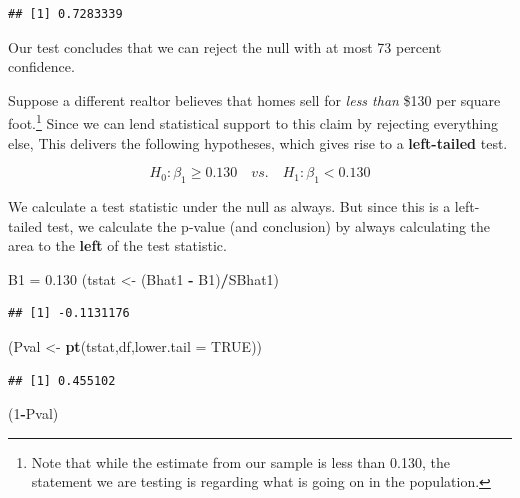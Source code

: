 \documentclass[
]{book}
\newenvironment{Shaded}{\begin{snugshade}}{\end{snugshade}}
\newcommand{\AttributeTok}[1]{\textcolor[rgb]{0.13,0.29,0.53}{#1}}
\newcommand{\ConstantTok}[1]{\textcolor[rgb]{0.56,0.35,0.01}{#1}}
\newcommand{\DecValTok}[1]{\textcolor[rgb]{0.00,0.00,0.81}{#1}}
\newcommand{\FloatTok}[1]{\textcolor[rgb]{0.00,0.00,0.81}{#1}}
\newcommand{\FunctionTok}[1]{\textcolor[rgb]{0.13,0.29,0.53}{\textbf{#1}}}
\newcommand{\NormalTok}[1]{#1}
\newcommand{\OtherTok}[1]{\textcolor[rgb]{0.56,0.35,0.01}{#1}}
\newcommand{\SpecialCharTok}[1]{\textcolor[rgb]{0.81,0.36,0.00}{\textbf{#1}}}
\begin{document}
\begin{verbatim}
## [1] 0.7283339
\end{verbatim}

Our test concludes that we can reject the null with at most 73 percent confidence.

Suppose a different realtor believes that homes sell for \emph{less than} \$130 per square foot.\footnote{Note that while the estimate from our sample is less than 0.130, the statement we are testing is regarding what is going on in the population.} Since we can lend statistical support to this claim by rejecting everything else, This delivers the following hypotheses, which gives rise to a \textbf{left-tailed} test.

\[H_0:\beta_1\geq0.130 \quad vs. \quad H_1:\beta_1<0.130\]

We calculate a test statistic under the null as always. But since this is a left-tailed test, we calculate the p-value (and conclusion) by always calculating the area to the \textbf{left} of the test statistic.

\begin{Shaded}
\begin{Highlighting}[]
\NormalTok{B1 }\OtherTok{=} \FloatTok{0.130}
\NormalTok{(tstat }\OtherTok{\textless{}{-}}\NormalTok{ (Bhat1 }\SpecialCharTok{{-}}\NormalTok{ B1)}\SpecialCharTok{/}\NormalTok{SBhat1)}
\end{Highlighting}
\end{Shaded}

\begin{verbatim}
## [1] -0.1131176
\end{verbatim}

\begin{Shaded}
\begin{Highlighting}[]
\NormalTok{(Pval }\OtherTok{\textless{}{-}} \FunctionTok{pt}\NormalTok{(tstat,df,}\AttributeTok{lower.tail =} \ConstantTok{TRUE}\NormalTok{))}
\end{Highlighting}
\end{Shaded}

\begin{verbatim}
## [1] 0.455102
\end{verbatim}

\begin{Shaded}
\begin{Highlighting}[]
\NormalTok{(}\DecValTok{1}\SpecialCharTok{{-}}\NormalTok{Pval)}
\end{Highlighting}
\end{Shaded}
\end{document}
